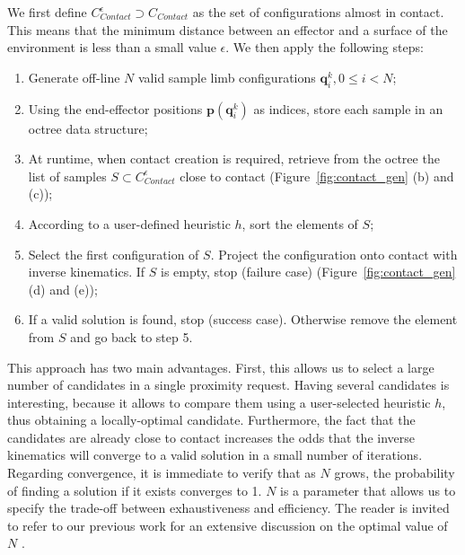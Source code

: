 We first define $C_{Contact}^{\epsilon} \supset C_{Contact}$ as the set of configurations almost in contact. This means that the minimum distance 
between an effector and a surface of the environment is less than a small value $\epsilon$.
We then apply the following steps:
\begin{enumerate}
\item Generate off-line $N$ valid sample limb configurations $\mathbf{q}^k_i,  0 \leq i < N$;
\item Using the end-effector positions $\mathbf{p}(\mathbf{q}^k_i)$ as indices, store each sample in an octree data structure;
\item At runtime, when contact creation is required, retrieve from the octree the list of samples $S \subset C_{Contact}^{\epsilon}$ close to contact (Figure~\ref{fig:contact_gen} (b) and (c));
\item According to a user-defined heuristic $h$, sort the elements of $S$;
\item Select the first configuration of $S$. Project the configuration onto contact with inverse kinematics. If $S$ is empty, stop (failure case) (Figure~\ref{fig:contact_gen} (d) and (e));
\item If a valid solution is found, stop (success case). Otherwise remove the element from $S$ and go back to step 5.
\end{enumerate}

This approach has two main advantages.
First, this allows us to select a large number of candidates in a single proximity request.
Having several candidates is interesting, because it allows to compare them using a user-selected heuristic $h$, thus obtaining
a locally-optimal candidate.
Furthermore, the fact that the candidates are already close to contact increases the odds that the inverse kinematics will converge to a valid solution in a small number of iterations.
Regarding convergence, it is immediate to verify that as $N$ grows, the probability of finding a solution if it exists converges to 1.
$N$ is a parameter that allows us to specify the trade-off between exhaustiveness and efficiency.
The reader is invited to refer to our previous work for an extensive discussion on the optimal value of $N$ \citep{Tonneau2014}.


